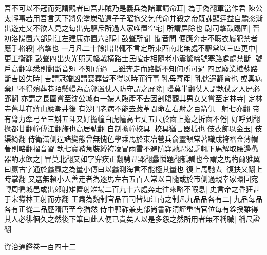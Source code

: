 吾不可以不冠而死謂觀者曰吾非賊乃是義兵為諸軍請命耳|{
	為于偽翻軍當作君}
陳公太輕事若用吾言天下將免塗炭弘遠子子曜抱父乞代命并殺之帝既誅顯逹益自驕恣漸出遊走又不欲人見之每出先驅斥所過人家唯置空宅|{
	所謂屏除也}
尉司擊鼓蹋圍|{
	晉初洛陽置六部尉江左建康亦置六部尉}
鼓聲所聞|{
	聞音問}
便應奔走不暇衣履犯禁者應手格殺|{
	格擊也}
一月凡二十餘出出輒不言定所東西南北無處不驅常以三四更中|{
	更工衡翻}
鼓聲四出火光照天幡戟横路士民喧走相隨老小震驚啼號塞路處處禁斷|{
	號戶高翻塞悉則翻斷音短}
不知所過|{
	言雖奔走而路斷不知何所可過}
四民廢業樵蘇路斷吉凶失時|{
	吉謂冠婚凶謂喪葬皆不得以時而行事}
乳母寄產|{
	乳儒遇翻育也}
或輿病棄尸不得殯葬巷陌懸幔為高鄣置仗人防守謂之屏除|{
	幔莫半翻仗人謂執仗之人屏必郢翻}
亦謂之長圍嘗至沈公城有一婦人臨產不去因剖腹觀其男女又嘗至定林寺|{
	定林寺舊基在蔣山應潮井後}
有沙門老病不能去藏革間命左右射之百箭俱|{
	射七亦翻}
帝有膂力牽弓至三斛五斗又好擔幢白虎幢高七丈五尺於齒上擔之折齒不倦|{
	好呼到翻擔都甘翻幢傅江翻旛也高居號翻}
自制擔幢校具|{
	校具猶言器械也}
伎衣飾以金玉|{
	伎渠綺翻}
侍衛滿側逞諸變態曾無愧色學乘馬於東冶營兵俞靈韻常著織成袴褶金薄㡌|{
	著則略翻褶音習}
執七寶矟急裝縛袴凌冒雨雪不避阬穽馳騁渴乏輒下馬解取腰邊蠡器酌水飲之|{
	冒莫北翻又如字穽疾正翻騁丑郢翻蠡憐題翻瓠瓢也今謂之馬杓爾雅翼曰蠃古字通於蠡蠃之為量小傳曰以蠡測海言不能極其量也}
復上馬馳去|{
	復扶又翻上時掌翻}
又選無賴小人善走者為逐馬左右五百人常以自隨或於市側過親幸家環回宛轉周徧城邑或出郊射雉置射雉場二百九十六處奔走往來略不暇息|{
	史言帝之昏狂甚于宋欎林王射而亦翻}
王肅為魏制官品百司皆如江南之制凡九品品各有二|{
	九品每品各有正從二品歷隋唐至今猶然}
侍中郭祚兼吏部尚書祚清謹重惜官位每有銓授雖得其人必徘徊久之然後下筆曰此人便已貴矣人以是多怨之然所用者無不稱職|{
	稱尺證翻}


資治通鑑卷一百四十二
